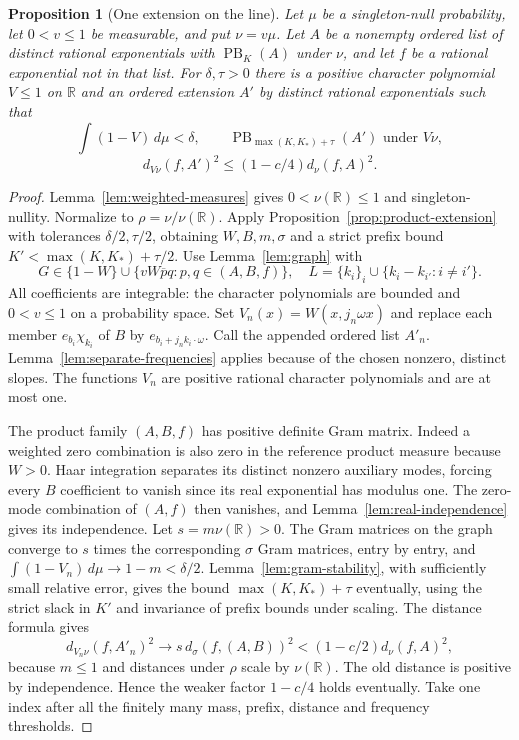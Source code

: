 \documentclass[reqno,a4paper,12pt]{amsart}
\newtheorem{proposition}[theorem]{Proposition}
\theoremstyle{definition}
\newcommand{\R}{\mathbb R}
\newcommand{\PB}{\operatorname{PB}}
\begin{document}
\begin{proposition}[One extension on the line]\label{prop:line-extension}
Let $\mu$ be a singleton-null probability, let $0<v\le1$ be measurable,
and put $\nu=v\mu$. Let $A$ be a nonempty ordered list of distinct
rational exponentials with $\PB_K(A)$ under $\nu$, and let $f$ be a
rational exponential not in that list. For $\delta,\tau>0$ there is
a positive character polynomial $V\le1$ on $\R$ and an ordered
extension $A'$ by distinct rational exponentials such that
\[
 \int(1-V)\,d\mu<\delta,\qquad
 \PB_{\max(K,K_*)+\tau}(A')\text{ under }V\nu,
\]
\[
 d_{V\nu}(f,A')^2\le(1-c/4)d_\nu(f,A)^2.
\]
\end{proposition}
\begin{proof}
Lemma~\ref{lem:weighted-measures} gives $0<\nu(\R)\le1$ and
singleton-nullity. Normalize to $\rho=\nu/\nu(\R)$.
Apply Proposition~\ref{prop:product-extension} with tolerances
$\delta/2,\tau/2$, obtaining $W,B,m,\sigma$ and a strict prefix
bound $K'<\max(K,K_*)+\tau/2$.
Use Lemma~\ref{lem:graph} with
\[
 G\in\{1-W\}\cup
 \{vW\overline p q:p,q\in(A,B,f)\},\quad
 L=\{k_i\}_i\cup\{k_i-k_{i'}:i\ne i'\}.
\]
All coefficients are integrable: the character polynomials are
bounded and $0<v\le1$ on a probability space.
Set $V_n(x)=W(x,j_n\omega x)$ and replace each member
$e_{b_i}\chi_{k_i}$ of $B$ by $e_{b_i+j_n k_i\cdot\omega}$.
Call the appended ordered list $A'_n$.
Lemma~\ref{lem:separate-frequencies} applies because of the chosen
nonzero, distinct slopes. The functions $V_n$ are positive rational
character polynomials and are at most one.

The product family $(A,B,f)$ has positive definite Gram matrix.
Indeed a weighted zero combination is also zero in the reference
product measure because $W>0$. Haar integration separates its
distinct nonzero auxiliary modes, forcing every $B$ coefficient to
vanish since its real exponential has modulus one. The zero-mode
combination of $(A,f)$ then vanishes, and
Lemma~\ref{lem:real-independence} gives its independence.
Let $s=m\nu(\R)>0$. The Gram matrices on the graph converge to
$s$ times the corresponding $\sigma$ Gram matrices, entry by entry,
and $\int(1-V_n)\,d\mu\to1-m<\delta/2$.
Lemma~\ref{lem:gram-stability}, with sufficiently small relative error,
gives the bound $\max(K,K_*)+\tau$ eventually, using the strict slack
in $K'$ and invariance of prefix bounds under scaling.
The distance formula gives
\[
 d_{V_n\nu}(f,A'_n)^2
 \longrightarrow s\,d_\sigma(f,(A,B))^2
 <(1-c/2)d_\nu(f,A)^2,
\]
because $m\le1$ and distances under $\rho$ scale by $\nu(\R)$.
The old distance is positive by independence. Hence the weaker
factor $1-c/4$ holds eventually. Take one index after all the finitely
many mass, prefix, distance and frequency thresholds.
\end{proof}
\end{document}
